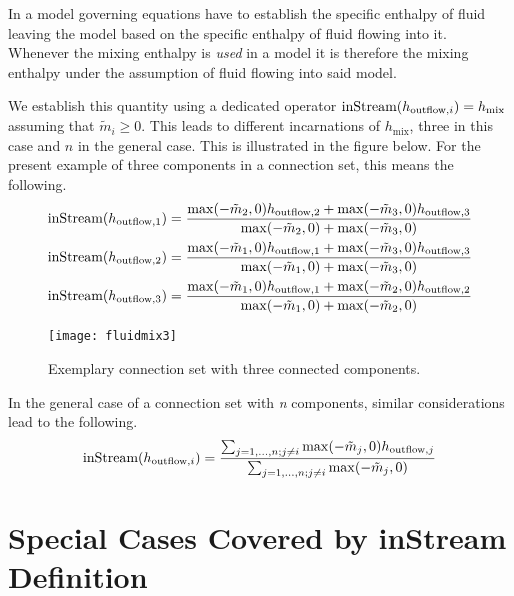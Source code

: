 In a model governing equations have to establish the specific enthalpy of fluid leaving the model based on the specific enthalpy of fluid flowing into it.
Whenever the mixing enthalpy is \emph{used} in a model it is therefore the mixing enthalpy under the assumption of fluid flowing into said model.

We establish this quantity using a dedicated operator $\text{\lstinline!inStream!}(h_{\mathrm{outflow},i})=h_{\mathrm{mix}}$ assuming that $\tilde{m}_{i} \geq 0$.
This leads to different incarnations of $h_{\mathrm{mix}}$, three in this case and $n$ in the general case.
This is illustrated in the figure below.
For the present example of three components in a connection set, this means the following.
\begin{align*}
\text{\lstinline!inStream!}(h_{\mathrm{outflow},1}) &= \frac{\operatorname{max}(-\tilde{m}_2,0)h_{\mathrm{outflow},2}+\operatorname{max}(-\tilde{m}_3,0)h_{\mathrm{outflow},3}}{\operatorname{max}(-\tilde{m}_2,0)+\operatorname{max}(-\tilde{m}_3,0)}\\
\text{\lstinline!inStream!}(h_{\mathrm{outflow},2}) &= \frac{\operatorname{max}(-\tilde{m}_1,0)h_{\mathrm{outflow},1}+\operatorname{max}(-\tilde{m}_3,0)h_{\mathrm{outflow},3}}{\operatorname{max}(-\tilde{m}_1,0)+\operatorname{max}(-\tilde{m}_3,0)}\\
\text{\lstinline!inStream!}(h_{\mathrm{outflow},3}) &= \frac{\operatorname{max}(-\tilde{m}_1,0)h_{\mathrm{outflow},1}+\operatorname{max}(-\tilde{m}_2,0)h_{\mathrm{outflow},2}}{\operatorname{max}(-\tilde{m}_1,0)+\operatorname{max}(-\tilde{m}_2,0)}
\end{align*}
\begin{figure}[H]
  \begin{center}
    \texttt{[image: fluidmix3]}
  \end{center}
  \caption{
    Exemplary connection set with three connected components.
  }
\end{figure}

In the general case of a connection set with \emph{n} components, similar considerations lead to the following.
\begin{equation*}
\text{\lstinline!inStream!}(h_{\mathrm{outflow},i})=\frac{\sum_{j=1,\dotsc,n;j\neq i}\operatorname{max}(-\tilde{m}_j,0)h_{\mathrm{outflow},j}}{\sum_{j=1,\dotsc,n;j\neq i}\operatorname{max}(-\tilde{m}_j,0)}
\end{equation*}

\section{Special Cases Covered by inStream Definition}\label{special-cases-covered-by-the-instream-operator-definition}

